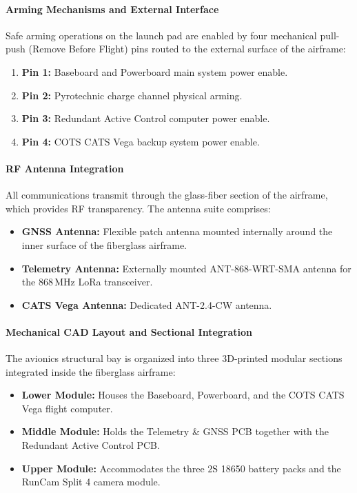 \documentclass[11pt, a4paper]{article} %
\begin{document}
\paragraph{Arming Mechanisms and External Interface}
Safe arming operations on the launch pad are enabled by four mechanical pull-push (Remove Before Flight) pins routed to the external surface of the airframe:
\begin{enumerate}
    \item \textbf{Pin 1:} Baseboard and Powerboard main system power enable.
    \item \textbf{Pin 2:} Pyrotechnic charge channel physical arming.
    \item \textbf{Pin 3:} Redundant Active Control computer power enable.
    \item \textbf{Pin 4:} COTS CATS Vega backup system power enable.
\end{enumerate}

\paragraph{RF Antenna Integration}
All communications transmit through the glass-fiber section of the airframe, which provides RF transparency. The antenna suite comprises:
\begin{itemize}
    \item \textbf{GNSS Antenna:} Flexible patch antenna mounted internally around the inner surface of the fiberglass airframe.
    \item \textbf{Telemetry Antenna:} Externally mounted ANT-868-WRT-SMA antenna for the $868\,\text{MHz}$ LoRa transceiver.
    \item \textbf{CATS Vega Antenna:} Dedicated ANT-2.4-CW antenna.
\end{itemize}

\paragraph{Mechanical CAD Layout and Sectional Integration}
The avionics structural bay is organized into three 3D-printed modular sections integrated inside the fiberglass airframe:
\begin{itemize}
    \item \textbf{Lower Module:} Houses the Baseboard, Powerboard, and the COTS CATS Vega flight computer.
    \item \textbf{Middle Module:} Holds the Telemetry \& GNSS PCB together with the Redundant Active Control PCB.
    \item \textbf{Upper Module:} Accommodates the three $2\text{S}$ 18650 battery packs and the RunCam Split 4 camera module.
\end{itemize}
\end{document}
